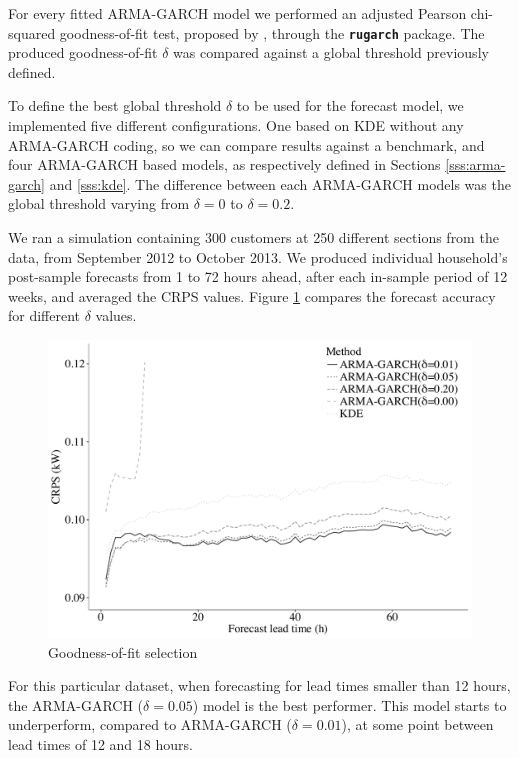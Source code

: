 \documentclass[preprint,3p,11pt,authoryear]{elsarticle}
\begin{document}
For every fitted ARMA-GARCH model we performed an adjusted Pearson chi-squared goodness-of-fit test, proposed by \citet{vlaarpalm_gof}, through the \texttt{\textbf{rugarch}} package.
The produced goodness-of-fit $\delta$ was compared against a global threshold previously defined.

To define the best global threshold $\delta$ to be used for the forecast model, we implemented five different configurations.
One based on KDE without any ARMA-GARCH coding, so we can compare results against a benchmark, and four ARMA-GARCH based models, as respectively defined in Sections \ref{sss:arma-garch} and \ref{sss:kde}.
The difference between each ARMA-GARCH models was the global threshold varying from $\delta = 0$ to $\delta = 0.2$.

We ran a simulation containing 300 customers at 250 different sections from the data, from September 2012 to October 2013.
We produced individual household's post-sample forecasts from 1 to 72 hours ahead, after each in-sample period of 12 weeks, and averaged the CRPS values.
Figure \ref{fig:benchmark} compares the forecast accuracy for different $\delta$ values.

\begin{figure}
  \centering
  \includegraphics[scale=0.5]{2017-10-13_big-gofmin_266_graylinesman.pdf}
  \caption{Goodness-of-fit selection}
  \label{fig:benchmark}
\end{figure}

For this particular dataset, when forecasting for lead times smaller than 12 hours, the ARMA-GARCH ($\delta = 0.05$) model is the best performer.
This model starts to underperform, compared to ARMA-GARCH ($\delta = 0.01$), at some point between lead times of 12 and 18 hours.
\end{document}
